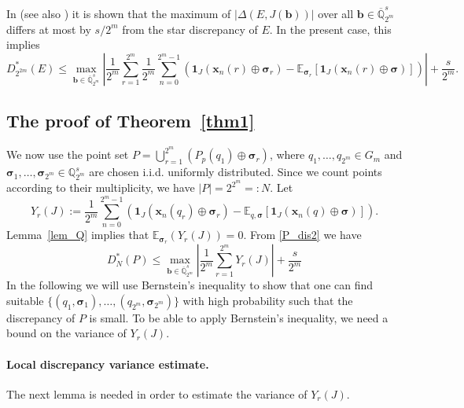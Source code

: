 \documentclass[12pt]{article}
\theoremstyle{definition}
\numberwithin{equation}{section}
\begin{document}
In \cite[Proof of Theorem~1]{HNWW01} (see also \cite[Proposition~3.17]{DKP10}) it is shown that the maximum of $|\Delta(E, J(\bm{b}))|$ over all $\bm{b} \in \overline{\mathbb{Q}}_{2^m}^s$ differs at most by $s/ 2^m$ from the star discrepancy of $E$. In the present case, this implies 
\begin{equation}\label{P_dis2}
D_{2^{2m}}^\ast(E) \le \max_{\bm{b} \in \overline{\mathbb{Q}}_{2^m}^s} \left| \frac{1}{2^m} \sum_{r=1}^{2^m} \frac{1}{2^m} \sum_{n=0}^{2^m-1} \left( \bm{1}_J(\bm{x}_n(r) \oplus \bm{\sigma}_r) - \mathbb{E}_{\bm{\sigma}_r}[\bm{1}_{J}(\bm{x}_n(r) \oplus \bm{\sigma})] \right) \right|  + \frac{s}{2^m}.
\end{equation}






\subsection{The proof of Theorem~\ref{thm1}}\label{sec:main}


We now use the point set $P = \bigcup_{r=1}^{2^m} ( P_p(q_1) \oplus \bm{\sigma}_r)$, where $q_1, \ldots, q_{2^m} \in G_m$ and $\bm{\sigma}_1, \ldots, \bm{\sigma}_{2^m} \in \mathbb{Q}_{2^m}^s$ are chosen i.i.d. uniformly distributed. Since we count points according to their multiplicity, we have $|P| = 2^{2^m} =: N$.
Let
\begin{equation}\label{defYr}
Y_r(J):=  \frac{1}{2^m} \sum_{n=0}^{2^m-1} \left(\mathbf{1}_J(\bm{x}_n(q_r) \oplus \bm{\sigma}_r) -  \mathbb{E}_{q, \bm{\sigma}} [ \mathbf{1}_J( \bm{x}_n(q) \oplus \bm{\sigma}) ] \right).
\end{equation}
Lemma~\ref{lem_Q} implies that $\mathbb{E}_{\bm{\sigma}_r}(Y_r(J)) = 0$. From \eqref{P_dis2} we have
\begin{equation}\label{bd:from2.3}
D_{N}^\ast(P) \le \max_{\bm{b} \in \overline{\mathbb{Q}}_{2^m}^s} \left|\frac{1}{2^m} \sum_{r=1}^{2^m} Y_r(J) \right| + \frac{s}{2^m}
\end{equation}
In the following we will use Bernstein's inequality to show that one can find suitable $\{(q_1, \bm{\sigma}_1), \ldots, (q_{2^m}, \bm{\sigma}_{2^m})\}$ with high probability such that the discrepancy of $P$ is small. To be able to apply Bernstein's inequality, we need a bound on the variance of $Y_r(J)$.



\paragraph{Local discrepancy variance estimate.} The next lemma is needed in order to estimate the variance of $Y_r(J)$.
\end{document}
